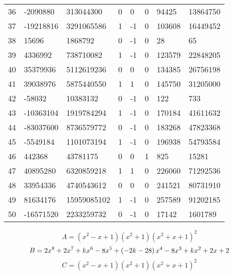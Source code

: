 \documentclass{amsart}
\begin{document}
\begin{longtable}{|l|l|l|lllll|}
36&-2090880&313044300&0&0&0&94425&13864750\\
37&-19218816&3291065586&1&-1&0&103608&16449452\\
38&15696&1868792&0&-1&0&28&65\\
39&4336992&738710082&1&-1&0&123579&22848205\\
40&35379936&5112619236&0&0&0&134385&26756198\\
41&39038976&5875440550&1&1&0&145750&31205000\\
42&-58032&10383132&0&-1&0&122&733\\
43&-10363104&1919784294&1&-1&0&170184&41611632\\
44&-83037600&8736579772&0&-1&0&183268&47823368\\
45&-5549184&1101073194&1&-1&0&196938&54793584\\
46&442368&43781175&0&0&1&825&15281\\
47&40895280&6320859218&1&1&0&226060&71292536\\
48&33954336&4740543612&0&0&0&241521&80731910\\
49&81634176&15959085102&1&-1&0&257589&91202185\\
50&-16571520&2233259732&0&-1&0&17142&1601789\\
\hline
\end{longtable}
$$A=(x^2
 - x
 + 1)(x^2
 + 1)(x^2
 + x
 + 1)^{2}$$
$$B=2\*x^8
 + 2\*x^7
 + k\*x^6
 - 8\*x^5
 + \left(-2\*k
 - 28\right) \*x^4
 - 8\*x^3
 + k\*x^2
 + 2\*x
 + 2$$
$$C=(x^2
 - x
 + 1)(x^2
 + 1)(x^2
 + x
 + 1)^{2}$$
\end{document}
